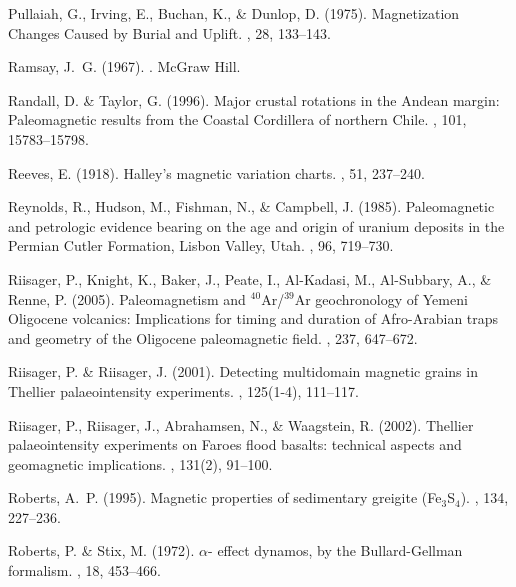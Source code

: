\documentclass[11pt]{book}
\begin{document}
\begin{thebibliography}{}
Pullaiah, G., Irving, E., Buchan, K., \& Dunlop, D. (1975).
\newblock Magnetization Changes Caused by Burial and Uplift.
, 28, 133--143.

Ramsay, J.~G. (1967).
.
\newblock McGraw Hill.

Randall, D. \& Taylor, G. (1996).
\newblock Major crustal rotations in the Andean margin: Paleomagnetic results
  from the Coastal Cordillera of northern Chile.
, 101, 15783--15798.

Reeves, E. (1918).
\newblock Halley's magnetic variation charts.
, 51, 237--240.

Reynolds, R., Hudson, M., Fishman, N., \& Campbell, J. (1985).
\newblock Paleomagnetic and petrologic evidence bearing on the age and origin
  of uranium deposits in the Permian Cutler Formation, Lisbon Valley, Utah.
, 96, 719--730.

Riisager, P., Knight, K., Baker, J., Peate, I., Al-Kadasi, M., Al-Subbary, A.,
  \& Renne, P. (2005).
\newblock Paleomagnetism and $^{40}$Ar/$^{39}$Ar geochronology of Yemeni
  Oligocene volcanics: Implications for timing and duration of Afro-Arabian
  traps and geometry of the Oligocene paleomagnetic field.
, 237, 647--672.

Riisager, P. \& Riisager, J. (2001).
\newblock Detecting multidomain magnetic grains in Thellier palaeointensity
  experiments.
, 125(1-4), 111--117.

Riisager, P., Riisager, J., Abrahamsen, N., \& Waagstein, R. (2002).
\newblock Thellier palaeointensity experiments on Faroes flood basalts:
  technical aspects and geomagnetic implications.
, 131(2), 91--100.

Roberts, A.~P. (1995).
\newblock Magnetic properties of sedimentary greigite (Fe$_3$S$_4$).
, 134, 227--236.

Roberts, P. \& Stix, M. (1972).
\newblock $\alpha$- effect dynamos, by the Bullard-Gellman formalism.
, 18, 453--466.


\end{thebibliography}
\end{document}
